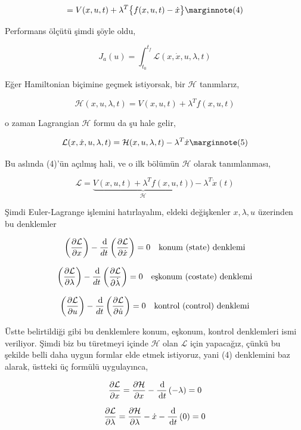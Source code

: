 \documentclass[12pt,fleqn]{article}\usepackage{../../common}
\begin{document}
$$
= V(x, u, t) +  \lambda^T \big\{ f(x, u, t) - \dot{x} \big\}
\mlabel{4}
$$


Performans ölçütü şimdi şöyle oldu,

$$
J_a(u) = \int _{t_0}^{t_f} \mathcal{L}( x, \dot{x}, u, \lambda, t)
$$

Eğer Hamiltonian biçimine geçmek istiyorsak, bir $\mathcal{H}$ tanımlarız,

$$
\mathcal{H}(x, u, \lambda, t) = V( x, u, t) + \lambda^T f(x, u, t)
$$

o zaman Lagrangian $\mathcal{H}$ formu da şu hale gelir,

$$
\mathcal{L}( x, \dot{x}, u, \lambda, t) = 
\mathcal{H}(x, u, \lambda, t) - \lambda^T \dot{x}
\mlabel{5}
$$

Bu aslında (4)'ün açılmış hali, ve o ilk bölümün $\mathcal{H}$ olarak tanımlanması,

$$ 
\mathcal{L} = \underbrace{V( x, u, t) + \lambda^T f( x, u, t))}_{\mathcal{H}} - 
\lambda^T \dot{x}(t) 
$$ 

Şimdi Euler-Lagrange işlemini hatırlayalım, eldeki değişkenler
$x,\lambda,u$ üzerinden bu denklemler

$$
\left( \frac{\partial \mathcal{L}}{\partial x} \right) -
\frac{\,\mathrm{d}}{dt} \left( \frac{\partial \mathcal{L}}{\partial \dot{x}} \right) 
= 0 
\quad
\textrm{konum (state) denklemi}
$$

$$
\left( \frac{\partial \mathcal{L}}{\partial \lambda} \right) -
\frac{\,\mathrm{d}}{dt} \left( \frac{\partial \mathcal{L}}{\partial \dot{\lambda}} \right) 
= 0
\quad
\textrm{eşkonum (costate) denklemi}
$$

$$
\left( \frac{\partial \mathcal{L}}{\partial u} \right) -
\frac{\,\mathrm{d}}{dt} \left( \frac{\partial \mathcal{L}}{\partial \dot{u}} \right) 
= 0
\quad
\textrm{kontrol (control) denklemi}
$$

Üstte belirtildiği gibi bu denklemlere konum, eşkonum, kontrol
denklemleri ismi veriliyor. Şimdi biz bu türetmeyi içinde
$\mathcal{H}$ olan $\mathcal{L}$ için yapacağız, çünkü bu şekilde
belli daha uygun formlar elde etmek istiyoruz, yani (4) denklemini baz
alarak, üstteki üç formülü uygulayınca,

$$
\frac{\partial \mathcal{L}}{\partial x} = 
\frac{\partial \mathcal{H}}{\partial x} - 
\frac{\,\mathrm{d}}{\,\mathrm{d} t} \left( -\lambda \right)   = 0
$$

$$
\frac{\partial \mathcal{L}}{\partial \lambda} = 
\frac{\partial \mathcal{H}}{\partial \lambda} - \dot{x} -
\frac{\,\mathrm{d}}{\,\mathrm{d} t} \left( 0 \right)   = 0
$$
\end{document}
